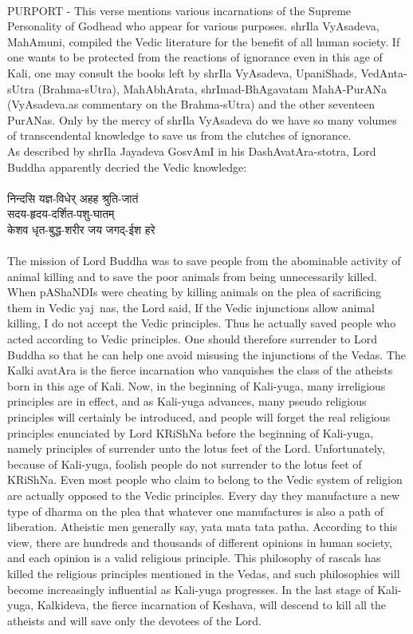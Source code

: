 \\
PURPORT - This verse mentions various incarnations of the Supreme Personality of Godhead who appear for various purposes. shrIla VyAsadeva, MahAmuni, compiled the Vedic literature for the benefit of all human society. If one wants to be protected from the reactions of ignorance even in this age of Kali, one may consult the books left by shrIla VyAsadeva, UpaniShads, VedAnta-sUtra (Brahma-sUtra), MahAbhArata, shrImad-BhAgavatam MahA-PurANa (VyAsadeva.as commentary on the Brahma-sUtra) and the other seventeen PurANas. Only by the mercy of shrIla VyAsadeva do we have so many volumes of transcendental knowledge to save us from the clutches of ignorance.\\
As described by shrIla Jayadeva GosvAmI in his DashAvatAra-stotra, Lord Buddha apparently decried the Vedic knowledge:  \\
\\
निन्दसि यज्ञ-विधेर् अहह श्रुति-जातं\\
सदय-हृदय-दर्शित-पशु-घातम्\\
केशव धृत-बुद्ध-शरीर जय जगद्-ईश हरे\\
\\
The mission of Lord Buddha was to save people from the abominable activity of animal killing and to save the poor animals from being unnecessarily killed. When pAShaNDIs were cheating by killing animals on the plea of sacrificing them in Vedic yaj~nas, the Lord said, ᳚If the Vedic injunctions allow animal killing, I do not accept the Vedic principles.᳚ Thus he actually saved people who acted according to Vedic principles. One should therefore surrender to Lord Buddha so that he can help one avoid misusing the injunctions of the Vedas.
The Kalki avatAra is the fierce incarnation who vanquishes the class of the atheists born in this age of Kali. Now, in the beginning of Kali-yuga, many irreligious principles are in effect, and as Kali-yuga advances, many pseudo religious principles will certainly be introduced, and people will forget the real religious principles enunciated by Lord KRiShNa before the beginning of Kali-yuga, namely principles of surrender unto the lotus feet of the Lord. Unfortunately, because of Kali-yuga, foolish people do not surrender to the lotus feet of KRiShNa. Even most people who claim to belong to the Vedic system of religion are actually opposed to the Vedic principles. Every day they manufacture a new type of dharma on the plea that whatever one manufactures is also a path of liberation. Atheistic men generally say, yata mata tata patha. According to this view, there are hundreds and thousands of different opinions in human society, and each opinion is a valid religious principle. This philosophy of rascals has killed the religious principles mentioned in the Vedas, and such philosophies will become increasingly influential as Kali-yuga progresses. In the last stage of Kali-yuga, Kalkideva, the fierce incarnation of Keshava, will descend to kill all the atheists and will save only the devotees of the Lord.\\
